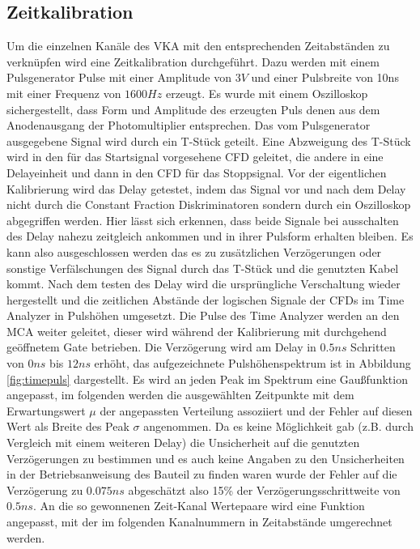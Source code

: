 \documentclass[a4paper,12pt]{article}
\begin{document}
	\subsection{Zeitkalibration}
		Um die einzelnen Kanäle des VKA mit den entsprechenden Zeitabständen zu verknüpfen wird eine Zeitkalibration durchgeführt. Dazu werden
		mit einem Pulsgenerator Pulse mit einer Amplitude von $3\si{V}$ und einer Pulsbreite von 10ns mit einer Frequenz von $1600\si{Hz}$ erzeugt.
		Es wurde mit einem Oszilloskop sichergestellt, dass Form und Amplitude des erzeugten Puls denen aus dem Anodenausgang der Photomultiplier 
		entsprechen. Das vom Pulsgenerator ausgegebene Signal wird durch ein T-Stück geteilt. Eine Abzweigung des T-Stück wird in den für das Startsignal vorgesehene 
		CFD geleitet, die andere in eine Delayeinheit und dann in den CFD für das Stoppsignal. Vor der eigentlichen Kalibrierung wird das Delay getestet, indem
		das Signal vor und nach dem Delay nicht durch die Constant Fraction Diskriminatoren sondern durch ein Oszilloskop abgegriffen werden. Hier lässt sich erkennen,
		dass beide Signale bei ausschalten des Delay nahezu zeitgleich ankommen und in ihrer Pulsform erhalten bleiben. Es kann also ausgeschlossen werden das es zu 
		zusätzlichen Verzögerungen oder sonstige Verfälschungen des Signal durch das T-Stück und die genutzten Kabel kommt.
		Nach dem testen des Delay wird die ursprüngliche Verschaltung wieder hergestellt und die zeitlichen Abstände der logischen Signale der CFDs im Time Analyzer
		in Pulshöhen umgesetzt. Die Pulse des Time Analyzer werden an den MCA weiter geleitet, dieser wird während der Kalibrierung mit
		durchgehend geöffnetem Gate betrieben. Die Verzögerung wird am Delay in $0.5\si{ns}$ Schritten von $0\si{ns}$ bis $12\si{ns}$ erhöht, das aufgezeichnete Pulshöhenspektrum 
		ist in Abbildung \ref{fig:timepuls} dargestellt. Es wird an jeden Peak im Spektrum eine Gaußfunktion angepasst, im folgenden werden die ausgewählten Zeitpunkte mit
		dem Erwartungswert $\mu$ der angepassten Verteilung assoziiert und der Fehler auf diesen Wert als Breite des Peak $\sigma$ angenommen. Da es keine Möglichkeit gab 
		(z.B. durch Vergleich mit einem weiteren Delay) die Unsicherheit auf die genutzten Verzögerungen zu bestimmen und es auch keine Angaben zu
		den Unsicherheiten in der Betriebsanweisung des Bauteil zu finden waren wurde der Fehler auf die Verzögerung zu $0.075\si{ns}$ abgeschätzt also 
		15\% der Verzögerungsschrittweite von $0.5\si{ns}$. An die so gewonnenen Zeit-Kanal Wertepaare wird eine Funktion angepasst, mit der im folgenden 
		Kanalnummern in Zeitabstände umgerechnet werden. 
		
\end{document}
